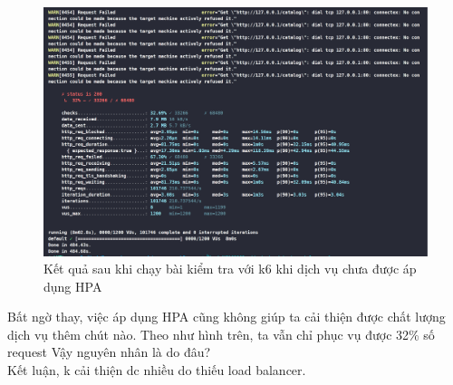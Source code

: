 \begin{figure}[H]
  \begin{center}
    \includegraphics[scale=0.44]{images/hanh/test-with-hpa.png}
    \caption{Kết quả sau khi chạy bài kiểm tra với k6 khi dịch vụ chưa được áp dụng HPA}
  \end{center}
  \label{}
\end{figure}
Bất ngờ thay, việc áp dụng HPA cũng không giúp ta cải thiện được chất lượng dịch vụ thêm chút nào. Theo như hình trên, ta vẫn chỉ phục vụ được 32\% số request Vậy nguyên nhân là do đâu?\\[0.5cm]
Kết luận, k cải thiện dc nhiều do thiếu load balancer.